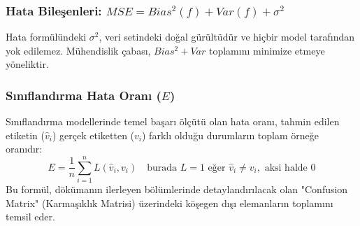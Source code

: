\documentclass[12pt,a4paper]{article}
\begin{document}
\subsubsection{Hata Bileşenleri: $MSE = Bias^2(f) + Var(f) + \sigma^2$}
Hata formülündeki $\sigma^2$, veri setindeki doğal gürültüdür ve hiçbir model tarafından yok edilemez. Mühendislik çabası, $Bias^2 + Var$ toplamını minimize etmeye yöneliktir.

\subsubsection{Sınıflandırma Hata Oranı ($E$)}
Sınıflandırma modellerinde temel başarı ölçütü olan hata oranı, tahmin edilen etiketin ($\hat{v}_i$) gerçek etiketten ($v_i$) farklı olduğu durumların toplam örneğe oranıdır:
\begin{equation}
    E = \frac{1}{n} \sum_{i=1}^{n} L(\hat{v}_i, v_i) \quad \text{burada } L=1 \text{ eğer } \hat{v}_i \neq v_i, \text{ aksi halde } 0
\end{equation}
Bu formül, dökümanın ilerleyen bölümlerinde detaylandırılacak olan "Confusion Matrix" (Karmaşıklık Matrisi) üzerindeki köşegen dışı elemanların toplamını temsil eder.
\end{document}
